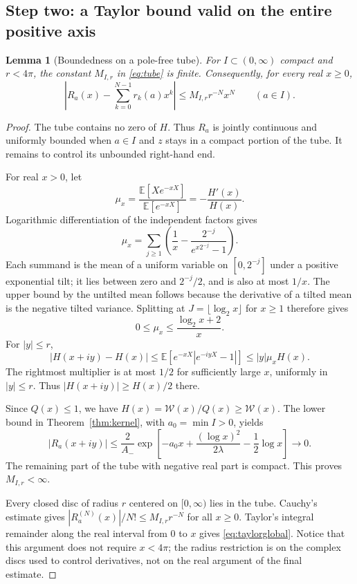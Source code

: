 \documentclass[11pt,letterpaper]{article}
\numberwithin{equation}{section}
\newtheorem{lemma}[theorem]{Lemma}
\theoremstyle{definition}
\theoremstyle{remark}
\newcommand{\E}{\mathbb E}
\newcommand{\W}{\mathcal W}
\begin{document}
\subsection{Step two: a Taylor bound valid on the entire positive axis}
\begin{lemma}[Boundedness on a pole-free tube]\label{lem:tubebound}
For $I\subset(0,\infty)$ compact and $r<4\pi$, the constant $M_{I,r}$ in
\eqref{eq:tube} is finite. Consequently, for every real $x\ge0$,
\begin{equation}\label{eq:taylorglobal}
 \left|R_a(x)-\sum_{k=0}^{N-1}r_k(a)x^k\right|
  \le M_{I,r}r^{-N}x^N\qquad(a\in I).
\end{equation}
\end{lemma}
\begin{proof}
The tube contains no zero of $H$. Thus $R_a$ is jointly continuous and
uniformly bounded when $a\in I$ and $z$ stays in a compact portion of the
tube. It remains to control its unbounded right-hand end.

For real $x>0$, let
\[
 \mu_x=\frac{\E[Xe^{-xX}]}{\E[e^{-xX}]}=-\frac{H'(x)}{H(x)}.
\]
Logarithmic differentiation of the independent factors gives
\begin{equation}\label{eq:tiltedmean}
 \mu_x=\sum_{j\ge1}
 \left(\frac1x-\frac{2^{-j}}{e^{x2^{-j}}-1}\right).
\end{equation}
Each summand is the mean of a uniform variable on $[0,2^{-j}]$ under a
positive exponential tilt; it lies between zero and $2^{-j}/2$, and is
also at most $1/x$. The upper bound by the untilted mean follows because
the derivative of a tilted mean is the negative tilted variance. Splitting at $J=\lfloor\log_2x\rfloor$ for $x\ge1$
therefore gives
\begin{equation}\label{eq:tiltedbound}
 0\le\mu_x\le\frac{\log_2x+2}{x}.
\end{equation}
For $|y|\le r$,
\[
 |H(x+iy)-H(x)|
 \le\E[e^{-xX}|e^{-iyX}-1|]
 \le |y|\mu_xH(x).
\]
The rightmost multiplier is at most $1/2$ for sufficiently large $x$,
uniformly in $|y|\le r$. Thus $|H(x+iy)|\ge H(x)/2$ there.

Since $Q(x)\le1$, we have $H(x)=\W(x)/Q(x)\ge\W(x)$.
The lower bound in Theorem~\ref{thm:kernel}, with $a_0=\min I>0$, yields
\[
 |R_a(x+iy)|\le\frac{2}{A_-}
 \exp\!\left[-a_0x+\frac{(\log x)^2}{2\lambda}
                   -\frac12\log x\right]\longrightarrow0.
\]
The remaining part of the tube with negative real part is compact. This
proves $M_{I,r}<\infty$.

Every closed disc of radius $r$ centered on $[0,\infty)$ lies in the tube.
Cauchy's estimate gives
$|R_a^{(N)}(x)|/N!\le M_{I,r}r^{-N}$ for all $x\ge0$.
Taylor's integral remainder along the real interval from $0$ to $x$ gives
\eqref{eq:taylorglobal}. Notice that this argument does not require
$x<4\pi$; the radius restriction is on the complex discs used to control
derivatives, not on the real argument of the final estimate.
\end{proof}
\end{document}
